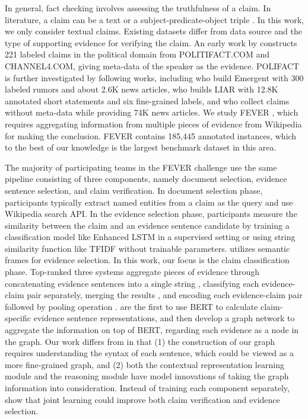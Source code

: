 \documentclass[11pt,a4paper]{article}
\begin{document}
In general, fact checking involves assessing the truthfulness of a claim.
In literature, a claim can be a text or a 
subject-predicate-object triple \cite{nakashole2014language}.
In this work, we only consider textual claims.
Existing datasets differ from data source and the type of supporting evidence for verifying the claim.
An early work by  constructs 221 labeled claims in the political domain from POLITIFACT.COM and CHANNEL4.COM, giving meta-data of the speaker as the evidence.
POLIFACT is further investigated by following works, 
including  who build Emergent with 300 labeled rumors and about 2.6K news articles,
 who builds LIAR with 12.8K annotated short statements and six fine-grained labels, 
and 
 who collect claims without meta-data while providing 74K news articles.
We study FEVER \cite{thorne2018fever}, which requires aggregating information from multiple pieces of evidence from Wikipedia for making the conclusion. 
FEVER contains 185,445 annotated instances, which to the best of our knowledge is the largest benchmark dataset in this area. 


The majority of participating teams in the FEVER challenge \cite{thorne2018fact} use the same pipeline consisting of three components, namely document selection, evidence sentence selection, and claim verification.
In document selection phase, participants typically extract named entities from a claim as the query and use Wikipedia search API.
In the evidence selection phase, participants measure the similarity between the claim and an evidence sentence candidate by training a classification model like Enhanced LSTM \cite{chen2016enhanced} in a supervised setting or using string similarity function like TFIDF without trainable parameters. \citet{padia-etal-2018-team} utilizes semantic frames for evidence selection.
In this work, our focus is the claim classification phase. 
Top-ranked three systems aggregate pieces of evidence through concatenating evidence sentences into a single string \cite{nie2019combining}, classifying each evidence-claim pair separately, merging the results \cite{yoneda2018ucl}, and encoding each evidence-claim pair followed by pooling operation \cite{hanselowski2018ukp}.
 are the first to use BERT to calculate claim-specific evidence sentence representations, and then develop a graph network to aggregate the information on top of BERT, regarding each evidence as a node in the graph. 
Our work differs from  in that (1) the construction of our graph requires understanding the syntax of each sentence, which could be viewed as a more fine-grained graph, and (2) both the contextual representation learning module and the reasoning module have model innovations of taking the graph information into consideration. 
Instead of training each component separately,  show that joint learning could improve both claim verification
and evidence selection.
\end{document}
